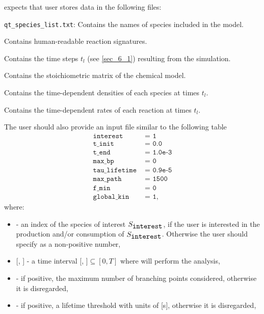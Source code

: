 \pump{} expects that user stores data in the following files:
\begin{description}
  \item{\verb|qt_species_list.txt|:} Contains the names of species included in the model. 
  \item{} Contains human-readable reaction signatures.  \item{} Contains the time steps $t_l$ (see \ref{sec_6_1}) resulting from the simulation.
  \item{} Contains the stoichiometric matrix of the chemical model.
  \item{} Contains the time-dependent densities of each species at times $t_l$.  
  \item{} Contains the time-dependent rates of each reaction at times $t_l$.  
  \item{} The user should also provide an input file similar to the following table
\begin{align*}
\texttt{interest} &\texttt{ =  1} \\
\texttt{t\_init} & \texttt{ = 0.0}\\ 
\texttt{t\_end} & \texttt{ = 1.0e-3}\\ 
\texttt{max\_bp} & \texttt{ = 0}\\ \label{eq:aram} \tag{*} 
\texttt{tau\_lifetime} & \texttt{ = 0.9e-5}\\ 
\texttt{max\_path} & \texttt{ = 1500}\\
\texttt{f\_min} & \texttt{ = 0}\\
\texttt{global\_kin} & \texttt{ = 1,}
\end{align*}
where:  
\begin{itemize}
\item{ - an index of the species of interest $S_{\verb"interest"}$, if the user is interested in the production and/or consumption of $S_{\verb"interest"}$.  Otherwise the user should specify  as a non-positive number,}
\item{[, ] - a time interval [, ]$\subseteq[0,T]$ where 
\pump{} will perform the analysis,}
\item{ - if positive, the maximum number of branching points considered, otherwise it is disregarded,}
\item{ - if positive, a lifetime threshold with units of [s], otherwise it is disregarded,}

\end{itemize}
\end{description}
